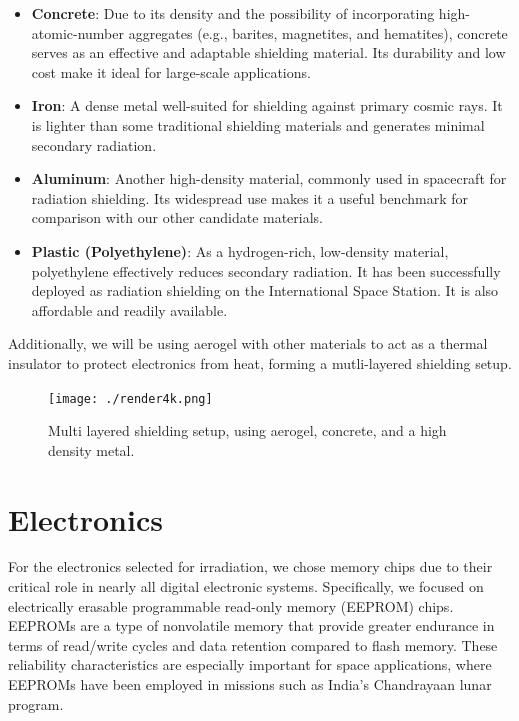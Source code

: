 \documentclass{article}
\begin{document}
\begin{itemize}
    \item \textbf{Concrete}: Due to its density and the possibility of incorporating high-atomic-number aggregates (e.g., barites, magnetites, and hematites), concrete serves as an effective and adaptable shielding material. Its durability and low cost make it ideal for large-scale applications. 

    \item \textbf{Iron}: A dense metal well-suited for shielding against primary cosmic rays. It is lighter than some traditional shielding materials and generates minimal secondary radiation.

    \item \textbf{Aluminum}: Another high-density material, commonly used in spacecraft for radiation shielding. Its widespread use makes it a useful benchmark for comparison with our other candidate materials.

    \item \textbf{Plastic (Polyethylene)}: As a hydrogen-rich, low-density material, polyethylene effectively reduces secondary radiation. It has been successfully deployed as radiation shielding on the International Space Station. It is also affordable and readily available.
\end{itemize}

Additionally, we will be using aerogel with other materials to act as a thermal insulator to protect electronics from heat, forming a mutli-layered shielding setup.

\begin{figure}[H]
    \centering
    \texttt{[image: ./render4k.png]}
    \caption{Multi layered shielding setup, using aerogel, concrete, and a high density metal.}
\end{figure}

\newpage
\vspace*{-5.5em}

\part{Electronics}
For the electronics selected for irradiation, we chose memory chips due to their critical role in nearly 
all digital electronic systems. Specifically, we focused on electrically erasable programmable read-only memory (EEPROM) chips.
EEPROMs are a type of nonvolatile memory that provide greater endurance in terms of read/write cycles and data retention compared to flash memory. 
These reliability characteristics are especially important for space applications, where EEPROMs have been employed in missions such as India's Chandrayaan lunar program. 
\end{document}
